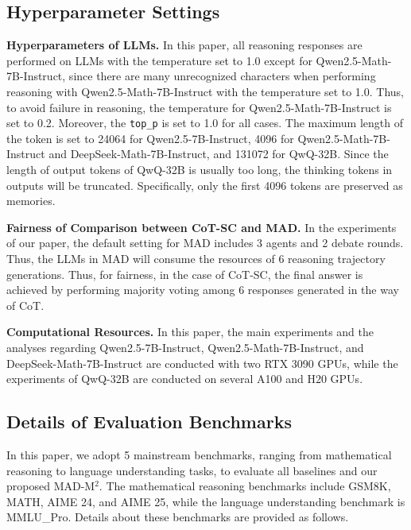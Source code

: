 \documentclass{article} %
\newcommand{\mymark}[1]{\textcolor{red}{#1}}
\newcommand{\methodname}{MAD-M$^2$}
\theoremstyle{plain}
\begin{document}
\subsection{Hyperparameter Settings}
\vspace{-4pt}
\textbf{Hyperparameters of LLMs.} In this paper, all reasoning responses are performed on LLMs with the temperature set to 1.0 except for Qwen2.5-Math-7B-Instruct, since there are many unrecognized characters when performing reasoning with Qwen2.5-Math-7B-Instruct with the temperature set to 1.0. Thus, to avoid failure in reasoning, the temperature for Qwen2.5-Math-7B-Instruct is set to 0.2. Moreover, the \texttt{top\_p} is set to 1.0 for all cases. The maximum length of the token is set to 24064 for Qwen2.5-7B-Instruct, 4096 for Qwen2.5-Math-7B-Instruct and DeepSeek-Math-7B-Instruct, and 131072 for QwQ-32B. Since the length of output tokens of QwQ-32B is usually too long, the thinking tokens in outputs will be truncated. Specifically, only the first 4096 tokens are preserved as memories.

\textbf{Fairness of Comparison between CoT-SC and MAD.} In the experiments of our paper, the default setting for MAD includes 3 agents and 2 debate rounds. Thus, the LLMs in MAD will consume the resources of 6 reasoning trajectory generations. Thus, for fairness, in the case of CoT-SC, the final answer is achieved by performing majority voting among 6 responses generated in the way of CoT.

\textbf{Computational Resources.} In this paper, the main experiments and the analyses regarding Qwen2.5-7B-Instruct, Qwen2.5-Math-7B-Instruct, and DeepSeek-Math-7B-Instruct are conducted with two RTX 3090 GPUs, while the experiments of QwQ-32B are conducted on several A100 and H20 GPUs.


\vspace{-8pt}
\subsection{Details of Evaluation Benchmarks}
\vspace{-4pt}
In this paper, we adopt 5 mainstream benchmarks, ranging from mathematical reasoning to language understanding tasks, to evaluate all baselines and our proposed \methodname. The mathematical reasoning benchmarks include GSM8K, MATH, AIME 24, and AIME 25, while the language understanding benchmark is MMLU\_Pro. Details about these benchmarks are provided as follows.
\end{document}
